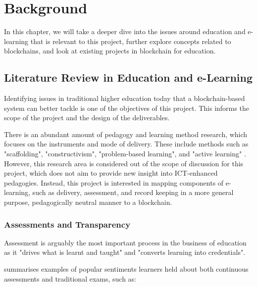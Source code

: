 
\chapter{Background}
\graphicspath{{Chapter2/Figs/Raster/}{Chapter2/Figs/PDF/}{Chapter2/Figs/}}
In this chapter, we will take a deeper dive into the issues around education and e-learning that
is relevant to this project, further explore concepts related to blockchains, and look at 
existing projects in blockchain for education.

\section{Literature Review in Education and e-Learning}

Identifying issues in traditional higher education today that a blockchain-based system can better
tackle is one of the objectives of this project. This informs the scope of the
project and the design of the deliverables.

There is an abundant amount of pedagogy and learning method research, which focuses on the
instruments and mode of delivery. These include methods such as "scaffolding", "constructivism",
"problem-based learning", and "active learning" \citep{ali2005effective}. However, this
research area is considered out of the scope of discussion for this project, which does not
aim to provide new insight into ICT-enhanced pedagogies. Instead, this project is interested in
mapping components of e-learning, such as delivery, assessment, and record keeping
in a more general purpose, pedagogically neutral manner to a blockchain.

\subsection{Assessments and Transparency}

Assessment is arguably the most important process in the business of education as it "drives what
is learnt and taught" and "converts learning into credentials". \citep[p.160]{campbell2010digital}

\citet[p.62-65]{brown1999assessment} summarises examples of popular sentiments learners held about both
continuous assessments and traditional exams, such as:

